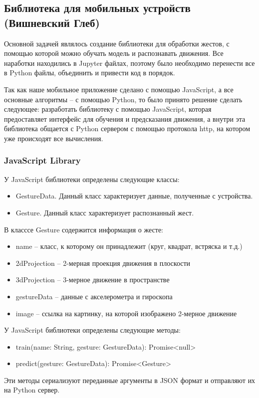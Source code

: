 \subsection{Библиотека для мобильных устройств (Вишневский Глеб)}

Основной задачей являлось создание библиотеки для обработки жестов, с помощью которой можно обучать модель и распознавать движения. Все наработки находились в Jupyter файлах, поэтому было необходимо перенести все в Python файлы, объединить и привести код в порядок. \newline

Так как наше мобильное приложение сделано с помощью JavaScript, а все основные алгоритмы – с помощью Python, то было принято решение сделать следующее: разработать библиотеку с помощью JavaScript, которая предоставляет интерфейс для обучения и предсказания движения, а внутри эта библиотека общается с Python сервером с помощью протокола http, на котором уже происходят все вычисления.

\subsubsection{JavaScript Library}
У JavaScript библиотеки определены следующие классы:
\begin{itemize}
  \item GestureData. Данный класс характеризует данные, полученные с устройства.
  \item Gesture. Данный класс характеризует распознанный жест.
\end{itemize}
В класссе Gesture содержится информация о жесте:
\begin{itemize}
  \item name -- класс, к которому он принадлежит (круг, квадрат, встряска и т.д.)
  \item 2dProjection -- 2-мерная проекция движения в плоскости
  \item 3dProjection -- 3-мерное движение в пространстве
  \item gestureData -- данные с акселерометра и гироскопа
  \item image -- ссылка на картинку, на которой изображено 2-мерное движение
\end{itemize}

У JavaScript библиотеки определены следующие методы:
\begin{itemize}
  \item train(name: String, gesture: GestureData): Promise<null> {} 
  \item predict(gesture: GestureData): Promise<Gesture> {}
\end{itemize}
Эти методы сериализуют переданные аргументы в JSON формат и отправляют их на Python сервер.


